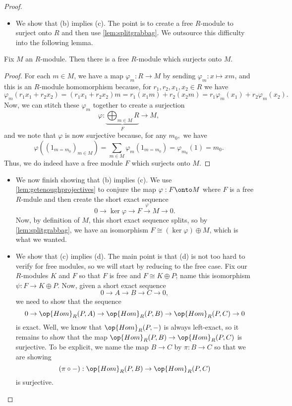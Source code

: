 \begin{proof}
\begin{itemize}
		\item We show that (b) implies (c). The point is to create a free $R$-module to surject onto $R$ and then use \autoref{lem:splitgrabbag}. We outsource this difficulty into the following lemma.
	\end{itemize}
	\begin{lemma} \label{lem:getenoughprojectives}
		Fix $M$ an $R$-module. Then there is a free $R$-module which surjects onto $M$.
	\end{lemma}
	\begin{proof}
		For each $m\in M$, we have a map $\varphi_m:R\to M$ by sending $\varphi_m:x\mapsto xm$, and this is an $R$-module homomorphism because, for $r_1,r_2,x_1,x_2\in R$ we have
		\[\varphi_m(r_1x_1+r_2x_2)=(r_1x_1+r_2x_2)m=r_1(x_1m)+r_2(x_2m)=r_1\varphi_m(x_1)+r_2\varphi_m(x_2).\]
		Now, we can stitch these $\varphi_m$ together to create a surjection
		\[\varphi:\underbrace{\bigoplus_{m\in M}R}_F\to M,\]
		and we note that $\varphi$ is now surjective because, for any $m_0,$ we have
		\[\varphi\left((1_{m=m_0})_{m\in M}\right)=\sum_{m\in M}\varphi_m(1_{m=m_0})=\varphi_{m_0}(1)=m_0.\]
		Thus, we do indeed have a free module $F$ which surjects onto $M$.
	\end{proof}
	\begin{itemize}
		\item[] We now finish showing that (b) implies (c). We use \autoref{lem:getenoughprojectives} to conjure the map $\varphi:F\onto M$ where $F$ is a free $R$-mdule and then create the short exact sequence
		\[0\to\ker\varphi\to F\stackrel\varphi\to M\to0.\]
		Now, by definition of $M$, this short exact sequence splits, so by \autoref{lem:splitgrabbag}, we have an isomorphism $F\cong(\ker\varphi)\oplus M$, which is what we wanted.
		\item We show that (c) implies (d). The main point is that (d) is not too hard to verify for free modules, so we will start by reducing to the free case. Fix our $R$-modules $K$ and $F$ so that $F$ is free and $F\cong K\oplus P$; name this isomorphism $\psi:F\to K\oplus P$. Now, given a short exact sequence
		\[0\to A\to B\to C\to 0,\]
		we need to show that the sequence
		\[0\to\op{Hom}_R(P,A)\to\op{Hom}_R(P,B)\to\op{Hom}_R(P,C)\to0\]
		is exact. Well, we know that $\op{Hom}_R(P,-)$ is always left-exact, so it remains to show that the map $\op{Hom}_R(P,B)\to\op{Hom}_R(P,C)$ is surjective. To be explicit, we name the map $B\to C$ by $\pi:B\to C$ so that we are showing
		\[(\pi\circ-):\op{Hom}_R(P,B)\to\op{Hom}_R(P,C)\]
		is surjective.


\end{itemize}
\end{proof}

